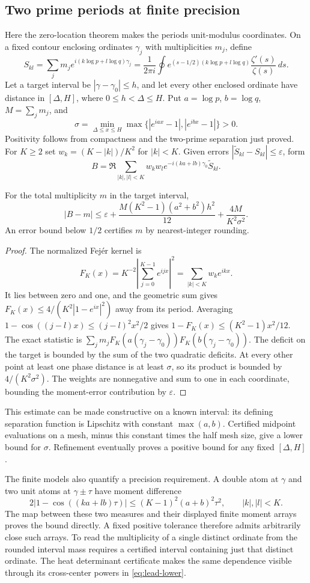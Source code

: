 \subsection{Two prime periods at finite precision}
Here the zero-location theorem makes the periods unit-modulus coordinates. On a fixed contour enclosing ordinates $\gamma_j$ with multiplicities $m_j$, define
\[
 S_{kl}=\sum_jm_je^{i(k\log p+l\log q)\gamma_j}
 =\frac1{2\pi i}\oint e^{(s-1/2)(k\log p+l\log q)}
                         \frac{\zeta'(s)}{\zeta(s)}\,ds.
\]
Let a target interval be $|\gamma-\gamma_0|\le h$, and let every other enclosed ordinate have distance in $[\Delta,H]$, where $0\le h<\Delta\le H$. Put $a=\log p$, $b=\log q$, $M=\sum_jm_j$, and
\[
 \sigma=\min_{\Delta\le x\le H}
       \max\{|e^{iax}-1|,|e^{ibx}-1|\}>0.
\]
Positivity follows from compactness and the two-prime separation just proved. For $K\ge2$ set $w_k=(K-|k|)/K^2$ for $|k|<K$. Given errors $|\widetilde S_{kl}-S_{kl}|\le\varepsilon$, form
\[
 B=\Re\sum_{|k|,|l|<K}w_kw_l
        e^{-i(ka+lb)\gamma_0}\widetilde S_{kl}.
\]
\begin{proposition}\label{prop:prime-rounding}
For the total multiplicity $m$ in the target interval,
\[
 |B-m|\le\varepsilon+
       \frac{M(K^2-1)(a^2+b^2)h^2}{12}
       +\frac{4M}{K^2\sigma^2}.
\]
An error bound below $1/2$ certifies $m$ by nearest-integer rounding.
\end{proposition}
\begin{proof}
The normalized Fej\'er kernel is
\[
 F_K(x)=K^{-2}\left|\sum_{j=0}^{K-1}e^{ijx}\right|^2
        =\sum_{|k|<K}w_ke^{ikx}.
\]
It lies between zero and one, and the geometric sum gives
$F_K(x)\le4/(K^2|1-e^{ix}|^2)$ away from its period. Averaging
$1-\cos((j-l)x)\le(j-l)^2x^2/2$ gives
$1-F_K(x)\le(K^2-1)x^2/12$. The exact statistic is
$\sum_jm_jF_K(a(\gamma_j-\gamma_0))F_K(b(\gamma_j-\gamma_0))$.
The deficit on the target is bounded by the sum of the two quadratic deficits. At every other point at least one phase distance is at least $\sigma$, so its product is bounded by $4/(K^2\sigma^2)$. The weights are nonnegative and sum to one in each coordinate, bounding the moment-error contribution by $\varepsilon$.
\end{proof}

This estimate can be made constructive on a known interval: its defining separation function is Lipschitz with constant $\max(a,b)$. Certified midpoint evaluations on a mesh, minus this constant times the half mesh size, give a lower bound for $\sigma$. Refinement eventually proves a positive bound for any fixed $[\Delta,H]$.

The finite models also quantify a precision requirement. A double atom at $\gamma$ and two unit atoms at $\gamma\pm\tau$ have moment difference
\[
 2|1-\cos((ka+lb)\tau)|\le(K-1)^2(a+b)^2\tau^2,
 \qquad |k|,|l|<K.
\]
The map between these two measures and their displayed finite moment arrays proves the bound directly. A fixed positive tolerance therefore admits arbitrarily close such arrays. To read the multiplicity of a single distinct ordinate from the rounded interval mass requires a certified interval containing just that distinct ordinate. The heat determinant certificate makes the same dependence visible through its cross-center powers in \eqref{eq:lead-lower}.
